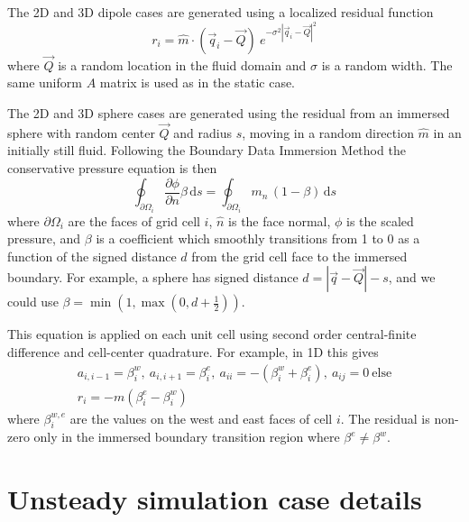 \documentclass[review]{elsarticle}
\begin{document}
The 2D and 3D dipole cases are generated using a localized residual function
$$ r_i = \hat m \cdot \left(\vec q_i-\vec Q\right)\ e^{-\sigma^2 |\vec q_i-\vec Q|^2} $$
where $\vec Q$ is a random location in the fluid domain and $\sigma$ is a random width. The same uniform $A$ matrix is used as in the static case.

The 2D and 3D sphere cases are generated using the residual from an immersed sphere with random center $\vec Q$ and radius $s$, moving in a random direction $\hat m$ in an initially still fluid. Following the Boundary Data Immersion Method \cite{maertens2015accurate,Lauber2022} the conservative  pressure equation is then
$$ \oint_{\partial\Omega_i} \frac{\partial \phi}{\partial n}\beta \,\text{d}s = \oint_{\partial\Omega_i} m_n \,(1-\beta)  \,\text{d}s $$
where $\partial\Omega_i$ are the faces of grid cell $i$, $\hat n$ is the face normal, $\phi$ is the scaled pressure, and $\beta$ is a coefficient which smoothly transitions from 1 to 0 as a function of the signed distance $d$ from the grid cell face to the immersed boundary. For example, a sphere has signed distance $d=|\vec q-\vec Q|-s$, and we could use $\beta=\min(1,\max(0,d+\frac 1 2))$.

This equation is applied on each unit cell using second order central-finite difference and cell-center quadrature. For example, in 1D this gives
\begin{gather*}
a_{i,i-1}=\beta^w_i,\ a_{i,i+1}=\beta^e_i ,\ a_{ii}=-(\beta^w_i+\beta^e_i),\ a_{ij}=0\ \text{else}\\
r_i =  -m\left(\beta^e_i-\beta^w_i\right)
\end{gather*}
where $\beta^{w,e}_i$ are the values on the west and east faces of cell $i$. The residual is non-zero only in the immersed boundary transition region where $\beta^e\ne\beta^w$.

\section{Unsteady simulation case details}\label{app flow}
\end{document}
